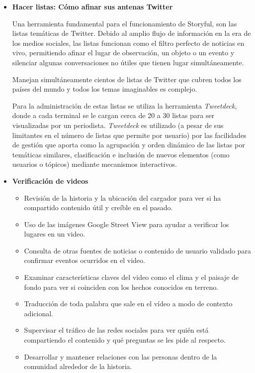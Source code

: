\begin{itemize}
	\item{\textbf{Hacer listas: Cómo afinar sus antenas Twitter}} \cite{storyfulblog}
	
	Una herramienta fundamental para el funcionamiento de Storyful, son las listas temáticas de Twitter. Debido al amplio flujo de información en la era de los medios sociales, las listas funcionan como el filtro perfecto de noticias en vivo, permitiendo afinar el lugar de observación, un objeto o un evento y silenciar algunas conversaciones no útiles que tienen lugar simultáneamente.
	
	Manejan simultáneamente cientos de listas de Twitter que cubren todos los países del mundo y todos los temas imaginables es complejo. 
	
	Para la administración de estas listas se utiliza la herramienta \emph{Tweetdeck}\cite{tweetdeck}, donde a cada terminal se le cargan cerca de 20 a 30 listas para ser visualizadas por un periodista. \emph{Tweetdeck} es utilizado (a pesar de sus limitantes en el número de listas que permite por usuario) por las facilidades de gestión que aporta como la agrupación y orden dinámico de las listas por temáticas similares, clasificación e inclusión de nuevos elementos (como usuarios o tópicos) mediante mecanismos interactivos.
	
	
	\item {\textbf{Verificación de videos}} \cite{storyfulblogvideos}
	
	\begin{itemize}
		\item Revisión de la historia y la ubicación del cargador para ver si ha compartido contenido útil y creíble en el pasado.
		\item Uso de las imágenes Google Street View para ayudar a verificar los lugares en un video.
		\item Consulta de otras fuentes de noticias o contenido de usuario validado para confirmar eventos ocurridos en el video.
		\item Examinar características claves del video como el clima y el paisaje de fondo para ver si coinciden con los hechos conocidos en terreno.
		\item Traducción de toda palabra que sale en el vídeo a modo de contexto adicional.
		\item Supervisar el tráfico de las redes sociales para ver quién está compartiendo el contenido y qué preguntas se les pide al respecto.
		\item Desarrollar y mantener relaciones con las personas dentro de la comunidad alrededor de la historia.
	\end{itemize}
	
\end{itemize}

